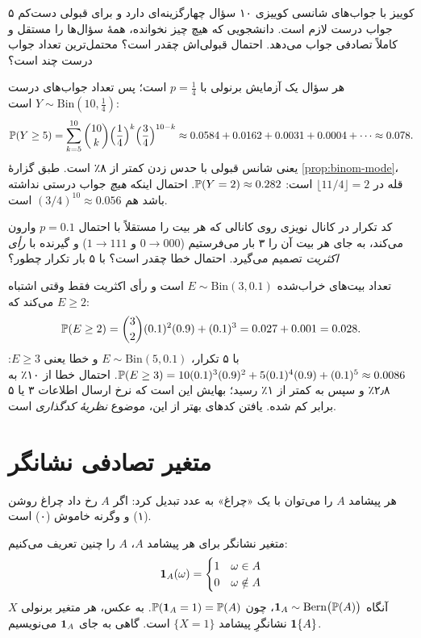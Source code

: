 \begin{example}[label=ex:quiz]{کوییز با جواب‌های شانسی}
کوییزی ۱۰ سؤال چهارگزینه‌ای دارد و برای قبولی دست‌کم ۵ جواب درست لازم است. دانشجویی که هیچ چیز نخوانده، همهٔ سؤال‌ها را مستقل و کاملاً تصادفی جواب می‌دهد. احتمال قبولی‌اش چقدر است؟ محتمل‌ترین تعداد جواب درست چند است؟
\begin{solution}
هر سؤال یک آزمایش برنولی با $p=\tfrac14$ است؛ پس تعداد جواب‌های درست $Y\sim\mathrm{Bin}(10,\tfrac14)$ است:
\[ \P(Y\ge5)=\sum_{k=5}^{10}\binom{10}{k}\Bigl(\frac14\Bigr)^k\Bigl(\frac34\Bigr)^{10-k}\approx0.0584+0.0162+0.0031+0.0004+\cdots\approx0.078. \]
یعنی شانس قبولی با حدس زدن کمتر از ۸٪ است. طبق گزارهٔ \ref{prop:binom-mode}، قله در $\lfloor11/4\rfloor=2$ است: $\P(Y=2)\approx0.282$. احتمال اینکه \emph{هیچ} جواب درستی نداشته باشد هم $(3/4)^{10}\approx0.056$ است.
\end{solution}
\end{example}

\begin{example}[label=ex:repetition]{کد تکرار در کانال نویزی}
روی کانالی که هر بیت را مستقلاً با احتمال $p=0.1$ وارون می‌کند، به جای هر بیت آن را ۳ بار می‌فرستیم ($0\to000$ و $1\to111$) و گیرنده با \emph{رأی اکثریت} تصمیم می‌گیرد. احتمال خطا چقدر است؟ با ۵ بار تکرار چطور؟
\begin{solution}
تعداد بیت‌های خراب‌شده $E\sim\mathrm{Bin}(3,0.1)$ است و رأی اکثریت فقط وقتی اشتباه می‌کند که $E\ge2$:
\[ \P(E\ge2)=\binom32(0.1)^2(0.9)+(0.1)^3=0.027+0.001=0.028. \]
با ۵ تکرار، $E\sim\mathrm{Bin}(5,0.1)$ و خطا یعنی $E\ge3$:
$\P(E\ge3)=10(0.1)^3(0.9)^2+5(0.1)^4(0.9)+(0.1)^5\approx0.0086$.
احتمال خطا از ۱۰٪ به ۲٫۸٪ و سپس به کمتر از ۱٪ رسید؛ بهایش این است که نرخ ارسال اطلاعات ۳ یا ۵ برابر کم شده. یافتن کدهای بهتر از این، موضوع \emph{نظریهٔ کدگذاری} است.
\end{solution}
\end{example}

\section{متغیر تصادفی نشانگر}
\label{sec:indicator}

هر پیشامد $A$ را می‌توان با یک «چراغ» به عدد تبدیل کرد: اگر $A$ رخ داد چراغ روشن (۱) و وگرنه خاموش (۰) است.

\begin{definition}[label=def:indicator]{متغیر نشانگر}
برای هر پیشامد $A$،  $A$ را چنین تعریف می‌کنیم:
\[ \ind_A(\omega)=\begin{cases}1 & \omega\in A\\ 0 & \omega\notin A\end{cases} \]
آنگاه $\ind_A\sim\mathrm{Bern}\bigl(\P(A)\bigr)$، چون $\P(\ind_A=1)=\P(A)$. به عکس، هر متغیر برنولی $X$ نشانگرِ پیشامد $\{X=1\}$ است. گاهی به جای $\ind_A$ می‌نویسیم $\ind\{A\}$.
\end{definition}


